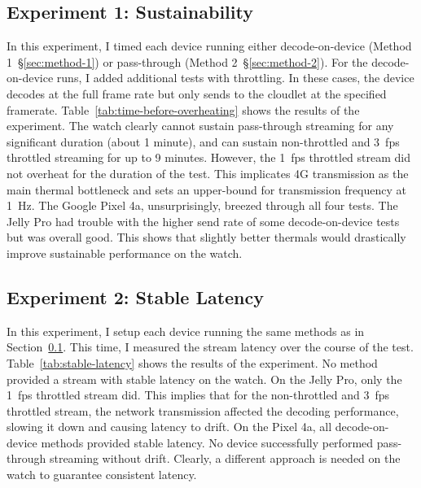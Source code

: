 \subsection{Experiment 1: Sustainability}
\label{sec:exp1-sustainability}
In this experiment, I timed each device running either decode-on-device (Method 1~\S\ref{sec:method-1}) or pass-through (Method 2~\S\ref{sec:method-2}). For the decode-on-device runs, I added additional tests with throttling. In these cases, the device decodes at the full frame rate but only sends to the cloudlet at the specified framerate. Table~\ref{tab:time-before-overheating} shows the results of the experiment. The watch clearly cannot sustain pass-through streaming for any significant duration (about 1 minute), and can sustain non-throttled and 3~fps throttled streaming for up to 9 minutes.  However, the 1~fps throttled stream did not overheat for the duration of the test. This implicates 4G transmission as the main thermal bottleneck and sets an upper-bound for transmission frequency at 1~Hz. The Google Pixel 4a, unsurprisingly, breezed through all four tests. The Jelly Pro had trouble with the higher send rate of some decode-on-device tests but was overall good. This shows that slightly better thermals would drastically improve sustainable performance on the watch. 


\subsection{Experiment 2: Stable Latency}
In this experiment, I setup each device running the same methods as in Section~\ref{sec:exp1-sustainability}. This time, I measured the stream latency over the course of the test. Table~\ref{tab:stable-latency} shows the results of the experiment. No method provided a stream with stable latency on the watch. On the Jelly Pro, only the 1~fps throttled stream did. This implies that for the non-throttled and 3~fps throttled stream, the network transmission affected the decoding performance, slowing it down and causing latency to drift. On the Pixel 4a, all decode-on-device methods provided stable latency. No device successfully performed pass-through streaming without drift. Clearly, a different approach is needed on the watch to guarantee consistent latency.


